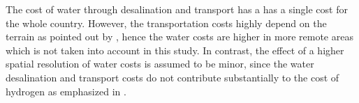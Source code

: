The cost of water through desalination and transport has a 
has a single cost for the whole country. However, the transportation costs highly depend on the terrain as pointed out by \cite{Caldera2016}, hence the water costs are higher in more remote areas which is not taken into account in this study. In contrast, the effect of a higher spatial resolution of water costs is assumed to be minor, since the water desalination and transport costs do not contribute substantially to the cost of hydrogen as emphasized in \cite{Hampp2023}. %


